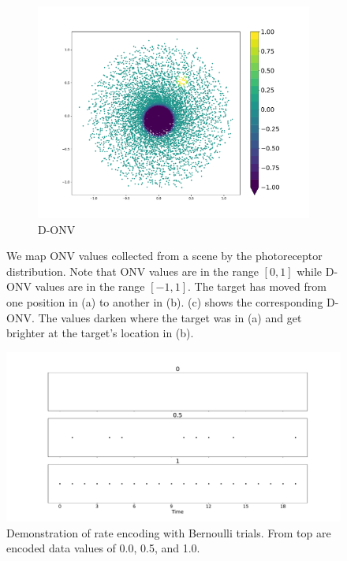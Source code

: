 \documentclass [MS] {UCLAthesis}
\begin{document}
\begin{figure}
\begin{subfigure}{0.49\textwidth}
        \centering
        \includegraphics[width=\textwidth]{onv_delta}
        \caption{D-ONV}
        \label{fig:onv_delta}
    \end{subfigure}
    \caption[ONV and D-ONV for a moving target]{We map ONV values collected from a scene by the photoreceptor distribution. Note that ONV values are in the range $[0,1]$ while D-ONV values are in the range $[-1,1]$. The target has moved from one position in (a) to another in (b). (c) shows the corresponding D-ONV. The values darken where the target was in (a) and get brighter at the target's location in (b). }
    \label{fig:three ONVs}
\end{figure}

\begin{figure}
    \centering
    \includegraphics[width=1.0\textwidth]{neuron_3_rate}
    \caption[Rate encoding with Bernoulli trials]{Demonstration of rate encoding with Bernoulli trials. From top are encoded data values of 0.0, 0.5, and 1.0.}
    \label{fig:rate_encode_3plots}
\end{figure}
\end{document}
